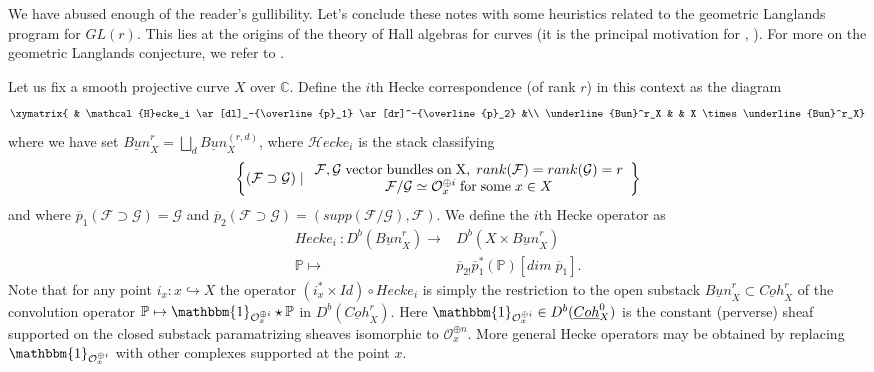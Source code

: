 \documentclass[a4paper,10pt]{amsart}
\numberwithin{equation}{section}
\begin{document}
\vspace{.2in}

We have abused enough of the reader's gullibility. Let's conclude these notes with some heuristics related to the geometric Langlands program for $GL(r)$. This lies at the origins of the theory of Hall algebras for curves (it is the principal motivation for \cite{Kapranov}, \cite{Laumon}). For more on the geometric Langlands conjecture, we refer to \cite{Frenkel}. 

\vspace{.1in}

Let us fix a smooth projective curve $X$ over $\mathbb{C}$. Define the $i$th Hecke correspondence (of rank $r$) in this context as the diagram
$$\xymatrix{ & \mathcal{H}ecke_i \ar[dl]_-{\overline{p}_1} \ar[dr]^-{\overline{p}_2} &\\ \underline{Bun}^r_X & & X \times \underline{Bun}^r_X}$$
where we have set $\underline{Bun}^r_X=\bigsqcup_d \underline{Bun}^{(r,d)}_X$, where $\mathcal{H}ecke_i$ is the stack classifying 
$$\left\{ (\mathcal{F} \supset \mathcal{G})\; |\; \begin{array}{c} \mathcal{F}, \mathcal{G}\; \text{vector\;bundles\;on\;X},\; rank(\mathcal{F})=rank(\mathcal{G})=r\\ \mathcal{F}/\mathcal{G} \simeq \mathcal{O}_x^{\oplus i}\;\text{for\;some\;}x \in X\end{array}\right\}$$
and where $\overline{p}_1(\mathcal{F} \supset \mathcal{G})=\mathcal{G}$ and $\overline{p}_2(\mathcal{F} \supset \mathcal{G})=(supp(\mathcal{F}/\mathcal{G}), \mathcal{F})$. We define the $i$th Hecke operator as
\begin{equation*}
\begin{split}
Hecke_i~: D^b(\underline{Bun}^r_X) \to& D^b(X \times \underline{Bun}^r_X)\\
\mathbb{P} \mapsto& \overline{p}_{2!}\overline{p}_1^*(\mathbb{P})[dim\;\overline{p}_1].
\end{split}
\end{equation*}
Note that for any point $i_x: x \hookrightarrow X$ the operator $(i_x^* \times Id) \circ Hecke_i$ is simply the restriction to the open substack $\underline{Bun}^r_X \subset \underline{Coh}^r_X$ of the convolution operator $\mathbb{P} \mapsto \mathbbm{1}_{\mathcal{O}_x^{\oplus i}} \star \mathbb{P}$ in $D^b(\underline{Coh}^r_X)$. Here $\mathbbm{1}_{\mathcal{O}_x^{\oplus i}} \in D^b(\underline{Coh}^0_X)$ is the constant (perverse) sheaf supported on the closed substack paramatrizing sheaves isomorphic to $\mathcal{O}_x^{\oplus n}$. More general Hecke operators may be obtained by replacing $\mathbbm{1}_{\mathcal{O}_x^{\oplus i}}$ with other complexes supported at the point $x$. 
\end{document}
